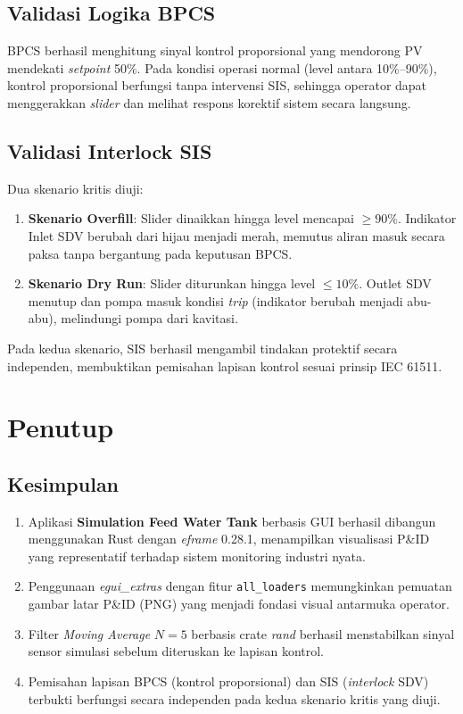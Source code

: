 \documentclass[12pt,a4paper]{article}
\begin{document}
\subsection{Validasi Logika BPCS}
BPCS berhasil menghitung sinyal kontrol proporsional yang mendorong PV
mendekati \textit{setpoint} 50\%. Pada kondisi operasi normal (level antara
10\%--90\%), kontrol proporsional berfungsi tanpa intervensi SIS, sehingga
operator dapat menggerakkan \textit{slider} dan melihat respons korektif
sistem secara langsung.

\subsection{Validasi Interlock SIS}
Dua skenario kritis diuji:
\begin{enumerate}
    \item \textbf{Skenario Overfill}: Slider dinaikkan hingga level mencapai
          $\geq 90\%$. Indikator Inlet SDV berubah dari hijau menjadi merah,
          memutus aliran masuk secara paksa tanpa bergantung pada keputusan
          BPCS.
    \item \textbf{Skenario Dry Run}: Slider diturunkan hingga level
          $\leq 10\%$. Outlet SDV menutup dan pompa masuk kondisi
          \textit{trip} (indikator berubah menjadi abu-abu), melindungi
          pompa dari kavitasi.
\end{enumerate}
Pada kedua skenario, SIS berhasil mengambil tindakan protektif secara
independen, membuktikan pemisahan lapisan kontrol sesuai prinsip IEC 61511.

\section{Penutup}

\subsection{Kesimpulan}
\begin{enumerate}
    \item Aplikasi \textbf{Simulation Feed Water Tank} berbasis GUI berhasil
          dibangun menggunakan Rust dengan \textit{eframe} 0.28.1,
          menampilkan visualisasi P\&ID yang representatif terhadap sistem
          monitoring industri nyata.
    \item Penggunaan \textit{egui\_extras} dengan fitur \texttt{all\_loaders}
          memungkinkan pemuatan gambar latar P\&ID (PNG) yang menjadi
          fondasi visual antarmuka operator.
    \item Filter \textit{Moving Average} $N=5$ berbasis crate \textit{rand}
          berhasil menstabilkan sinyal sensor simulasi sebelum diteruskan
          ke lapisan kontrol.
    \item Pemisahan lapisan BPCS (kontrol proporsional) dan SIS
          (\textit{interlock} SDV) terbukti berfungsi secara independen
          pada kedua skenario kritis yang diuji.
\end{enumerate}
\end{document}
